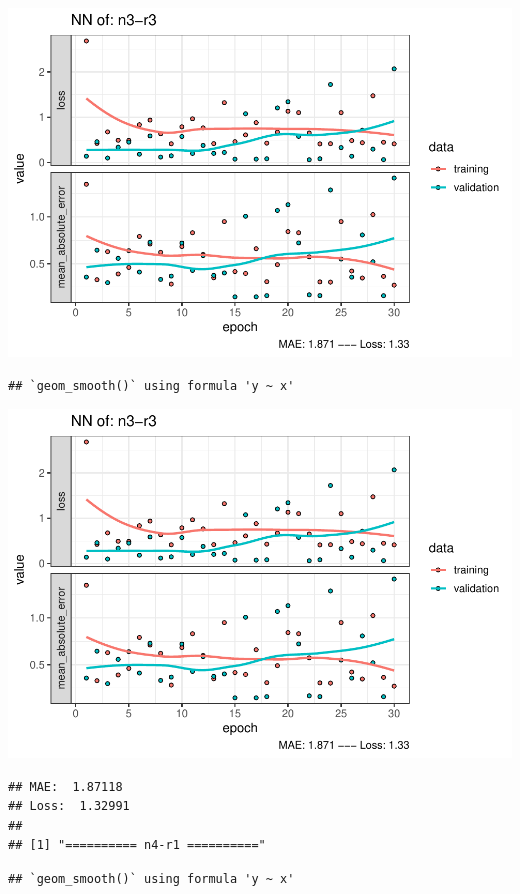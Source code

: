 \documentclass[
]{article}
\begin{document}
\includegraphics{project-code_files/figure-latex/unnamed-chunk-18-27.pdf}

\begin{verbatim}
## `geom_smooth()` using formula 'y ~ x'
\end{verbatim}

\includegraphics{project-code_files/figure-latex/unnamed-chunk-18-28.pdf}

\begin{verbatim}
## MAE:  1.87118
## Loss:  1.32991 
## 
## [1] "========== n4-r1 =========="
\end{verbatim}

\begin{verbatim}
## `geom_smooth()` using formula 'y ~ x'
\end{verbatim}
\end{document}
